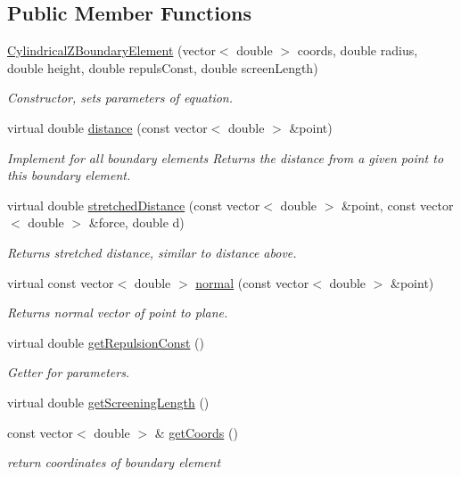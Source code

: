 \subsection*{Public Member Functions}
\begin{DoxyCompactItemize}
\item 
\hyperlink{classCylindricalZBoundaryElement_a32125b8a959d46949177a984e555e689}{Cylindrical\+Z\+Boundary\+Element} (vector$<$ double $>$ coords, double radius, double height, double repuls\+Const, double screen\+Length)
\begin{DoxyCompactList}\small\item\em Constructor, sets parameters of equation. \end{DoxyCompactList}\item 
virtual double \hyperlink{classCylindricalZBoundaryElement_a2532a472c9cd58a65940f43e05050d97}{distance} (const vector$<$ double $>$ \&point)
\begin{DoxyCompactList}\small\item\em Implement for all boundary elements Returns the distance from a given point to this boundary element. \end{DoxyCompactList}\item 
virtual double \hyperlink{classCylindricalZBoundaryElement_a6c3fc8e0f7bf828c21b70c396ed88dc0}{stretched\+Distance} (const vector$<$ double $>$ \&point, const vector$<$ double $>$ \&force, double d)
\begin{DoxyCompactList}\small\item\em Returns stretched distance, similar to distance above. \end{DoxyCompactList}\item 
virtual const vector$<$ double $>$ \hyperlink{classCylindricalZBoundaryElement_a5832dede61b710421f5307d5b7bfb982}{normal} (const vector$<$ double $>$ \&point)
\begin{DoxyCompactList}\small\item\em Returns normal vector of point to plane. \end{DoxyCompactList}\item 
virtual double \hyperlink{classCylindricalZBoundaryElement_a6f090f1ff1ebf10695ab3cf2db3fb8bf}{get\+Repulsion\+Const} ()
\begin{DoxyCompactList}\small\item\em Getter for parameters. \end{DoxyCompactList}\item 
virtual double \hyperlink{classCylindricalZBoundaryElement_afe407ba95087aff6598141daccb06d39}{get\+Screening\+Length} ()
\item 
const vector$<$ double $>$ \& \hyperlink{classBoundaryElement_ace76817d750bb44c11edd918f1a8b78f}{get\+Coords} ()
\begin{DoxyCompactList}\small\item\em return coordinates of boundary element \end{DoxyCompactList}\end{DoxyCompactItemize}

